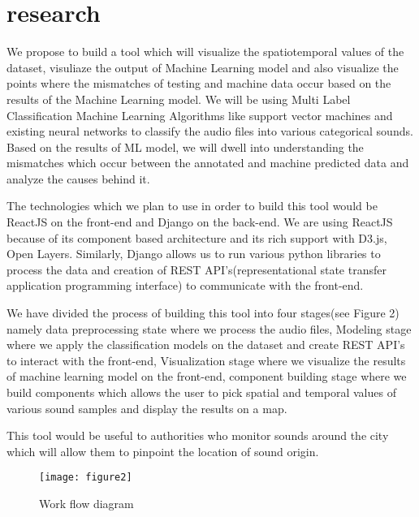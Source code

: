 	\section{research}
    We propose to build a tool which will visualize the spatiotemporal values of the dataset, visuliaze the output of Machine Learning model and also visualize the points where the mismatches of testing and machine data occur based on the results of the Machine Learning model. We will be using Multi Label Classification Machine Learning Algorithms like support vector machines and existing neural networks to classify the audio files into various categorical sounds. Based on the results of ML model, we will dwell into understanding the mismatches which occur between the annotated and machine predicted data and analyze the causes behind it. 
    
    The technologies which we plan to use in order to build this tool would be ReactJS on the front-end and Django on the back-end. We are using ReactJS because of its component based architecture and its rich support with D3.js, Open Layers. Similarly, Django allows us to run various python libraries to process the data and creation of REST API's(representational state transfer application programming interface) to communicate with the front-end. 
   
   	We have divided the process of building this tool into four stages(see Figure 2) namely data preprocessing state where we process the audio files, Modeling stage where we apply the classification models on the dataset and create REST API's to interact with the front-end, Visualization stage where we visualize the results of machine learning model on the front-end, component building stage where we build components which allows the user to pick spatial and temporal values of various sound samples and display the results on a map.
   	
    This tool would be useful to authorities who monitor sounds around the city which will allow them to pinpoint the location of sound origin.
	\begin{figure}[h!]
	\texttt{[image: figure2]}
	\caption{ Work flow diagram}
	\end{figure}
	
	
